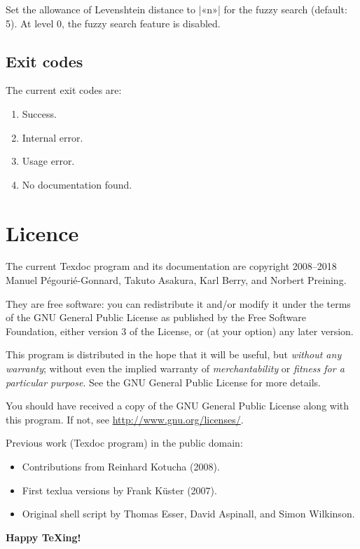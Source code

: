 \documentclass[a4paper, oneside]{scrartcl}
\begin{document}
Set the allowance of Levenshtein distance to |«n»| for the fuzzy search
(default: 5). At level 0, the fuzzy search feature is disabled.

\subsection{Exit codes}\label{ss-exit}

The current exit codes are:
\begin{enumerate}[start=0]
  \item Success.
  \item Internal error.
  \item Usage error.
  \item No documentation found.
\end{enumerate}

\section{Licence}\label{s-licence}

The current Texdoc program and its documentation are copyright 2008--2018
Manuel Pégourié-Gonnard, Takuto Asakura, Karl Berry, and Norbert Preining.

They are free software: you can redistribute it and/or modify it under the
terms of the GNU General Public License as published by the Free Software
Foundation, either version 3 of the License, or (at your option) any later
version.

This program is distributed in the hope that it will be useful, but
\emph{without any warranty}; without even the implied warranty of
\emph{merchantability} or \emph{fitness for a particular purpose}.  See the
GNU General Public License for more details.

You should have received a copy of the GNU General Public License along with
this program.  If not, see \url{http://www.gnu.org/licenses/}.

\bigskip

Previous work (Texdoc program) in the public domain:
\begin{itemize}
  \item Contributions from Reinhard Kotucha (2008).
  \item First texlua versions by Frank Küster (2007).
  \item Original shell script by Thomas Esser, David Aspinall, and Simon
	Wilkinson.
\end{itemize}

\bigskip
\begin{center}\Large\bfseries
  Happy {\TeX}ing!
\end{center}
\end{document}
